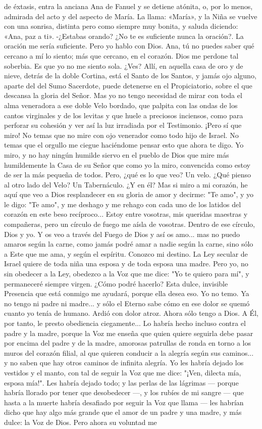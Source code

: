 \documentclass[12pt]{book} %
\begin{document}
de éxtasis, entra la anciana Ana de Fanuel y se detiene atónita, o, por lo menos, admirada del acto y del aspecto de María. 
La llama: «María», y la Niña se vuelve con una sonrisa, distinta pero como siempre muy bonita, y saluda diciendo: «Ana, 
paz a ti». 
-¿Estabas orando? ¿No te es suficiente nunca la oración?. 
La oración me sería suficiente. Pero yo hablo con Dios. Ana, tú no puedes saber qué cercano a mí lo siento; más que 
cercano, en el corazón. Dios me perdone tal soberbia. Es que yo no me siento sola. ¿Ves? Allí, en aquella casa de oro y de nieve, detrás de la doble Cortina, está el Santo de los Santos, y jamás ojo alguno, aparte del del Sumo Sacerdote, puede detenerse en el Propiciatorio, sobre el que descansa la gloria del Señor. Mas yo no tengo necesidad de mirar con toda el alma veneradora a ese doble Velo bordado, que palpita con las ondas de los cantos virginales y de los levitas y que huele a preciosos inciensos, como para perforar su cohesión y ver así la luz irradiada por el Testimonio. ¡Pero sí que miro! No temas que no mire con ojo venerador como todo hijo de Israel. No temas que el orgullo me ciegue haciéndome pensar esto que ahora te digo. Yo miro, y no hay ningún humilde siervo en el pueblo de Dios que mire más humildemente la Casa de su Señor que como yo la miro, convencida como estoy de ser la más pequeña de todos. Pero, ¿qué es lo que veo? Un velo. ¿Qué pienso al otro lado del Velo? Un Tabernáculo. ¿Y en él? Mas si miro a mi corazón, he aquí que veo a Dios resplandecer en su gloria de amor y decirme: "Te amo", y yo le digo: "Te amo", y me deshago y me rehago con cada uno de los latidos del corazón en este beso recíproco... Estoy entre vosotras, mis queridas maestras y compañeras, pero un círculo de fuego me aísla de vosotras. Dentro de ese círculo, Dios y yo. Y os veo a través del Fuego de Dios y así os amo... mas no puedo amaros según la carne, como jamás podré amar a nadie según la carne, sino sólo a Este que me ama, y según el espíritu. Conozco mi destino. La Ley secular de Israel quiere de toda niña una esposa y de toda esposa una madre. Pero yo, no sin obedecer a la Ley, obedezco a la Voz que me dice: "Yo te quiero para mí", y permaneceré siempre virgen. ¿Cómo podré hacerlo? Esta dulce, invisible Presencia que está conmigo me ayudará, porque ella desea eso. Yo no temo. Ya no tengo ni padre ni madre... y sólo el Eterno sabe cómo en ese dolor se quemó cuanto yo tenía de humano. Ardió con dolor atroz. Ahora sólo tengo a Dios. A Él, por tanto, le presto obediencia ciegamente... Lo habría hecho incluso contra el padre y la madre, porque la Voz me enseña que quien quiere seguirla debe pasar por encima del padre y de la madre, amorosas patrullas de ronda en torno a los muros del corazón filial, al que quieren conducir a la alegría según sus caminos... y no saben que hay otros caminos de infinita alegría. Yo les habría dejado los vestidos y el manto, con tal de seguir la Voz que me dice: "¡Ven, dilecta mía, esposa mía!". Les habría dejado todo; y las perlas de las lágrimas — porque habría llorado por tener que desobedecer —, y los rubíes de mi sangre — que hasta a la muerte habría desafiado por seguir la Voz que llama — les habrían dicho que hay algo más grande que el amor de un padre y una madre, y más dulce: la Voz de Dios. Pero ahora su voluntad me 
\end{document}
